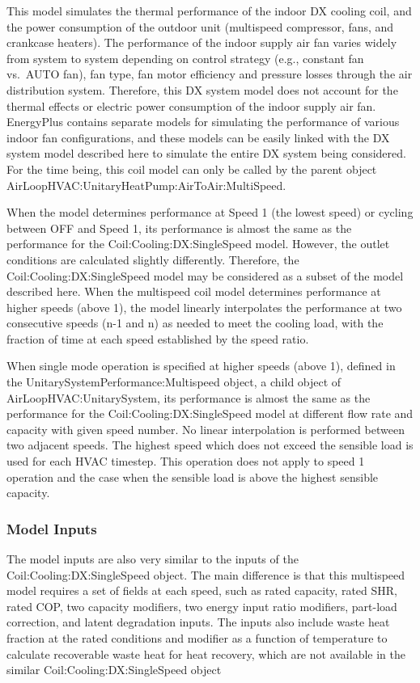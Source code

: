 This model simulates the thermal performance of the indoor DX cooling coil, and the power consumption of the outdoor unit (multispeed compressor, fans, and crankcase heaters). The performance of the indoor supply air fan varies widely from system to system depending on control strategy (e.g., constant fan vs.~AUTO fan), fan type, fan motor efficiency and pressure losses through the air distribution system. Therefore, this DX system model does not account for the thermal effects or electric power consumption of the indoor supply air fan. EnergyPlus contains separate models for simulating the performance of various indoor fan configurations, and these models can be easily linked with the DX system model described here to simulate the entire DX system being considered. For the time being, this coil model can only be called by the parent object AirLoopHVAC:UnitaryHeatPump:AirToAir:MultiSpeed.

When the model determines performance at Speed 1 (the lowest speed) or cycling between OFF and Speed 1, its performance is almost the same as the performance for the Coil:Cooling:DX:SingleSpeed model. However, the outlet conditions are calculated slightly differently. Therefore, the Coil:Cooling:DX:SingleSpeed model may be considered as a subset of the model described here. When the multispeed coil model determines performance at higher speeds (above 1), the model linearly interpolates the performance at two consecutive speeds (n-1 and n) as needed to meet the cooling load, with the fraction of time at each speed established by the speed ratio.

When single mode operation is specified at higher speeds (above 1), defined in the UnitarySystemPerformance:Multispeed object, a child object of AirLoopHVAC:UnitarySystem, its performance is almost the same as the performance for the Coil:Cooling:DX:SingleSpeed model at different flow rate and capacity with given speed number. No linear interpolation is performed between two adjacent speeds. The highest speed which does not exceed the sensible load is used for each HVAC timestep. This operation does not apply to speed 1 operation and the case when the sensible load is above the highest sensible capacity.

\subsubsection{Model Inputs}\label{model-inputs}

The model inputs are also very similar to the inputs of the Coil:Cooling:DX:SingleSpeed object. The main difference is that this multispeed model requires a set of fields at each speed, such as rated capacity, rated SHR, rated COP, two capacity modifiers, two energy input ratio modifiers, part-load correction, and latent degradation inputs. The inputs also include waste heat fraction at the rated conditions and modifier as a function of temperature to calculate recoverable waste heat for heat recovery, which are not available in the similar Coil:Cooling:DX:SingleSpeed object

